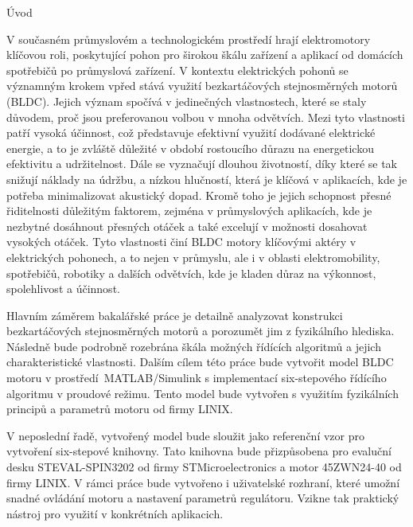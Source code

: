
\def\ctustyle{{\ssr CTUstyle}}
\def\ttb{\tt\char`\\} %

\chap Úvod


V současném průmyslovém a technologickém prostředí hrají elektromotory klíčovou roli, poskytující pohon pro širokou 
škálu zařízení a aplikací od domácích spotřebičů po průmyslová zařízení. V kontextu elektrických pohonů se významným krokem 
vpřed stává využití bezkartáčových stejnosměrných motorů (BLDC). Jejich význam spočívá 
v jedinečných vlastnostech, které se staly důvodem, proč jsou preferovanou volbou v mnoha odvětvích. 
Mezi tyto vlastnosti patří vysoká účinnost, což představuje efektivní využití dodávané elektrické energie, a to je zvláště 
důležité v období rostoucího důrazu na energetickou efektivitu a udržitelnost. Dále se vyznačují dlouhou životností, díky které se
 tak snižují náklady na údržbu, a nízkou hlučností, která je klíčová v aplikacích, kde je potřeba minimalizovat akustický dopad. 
Kromě toho je jejich schopnost přesné řiditelnosti důležitým faktorem, zejména v průmyslových aplikacích, kde je nezbytné 
dosáhnout přesných otáček a také excelují v možnosti dosahovat vysokých otáček. Tyto vlastnosti činí BLDC motory klíčovými aktéry v elektrických pohonech, a to 
nejen v průmyslu, ale i v oblasti elektromobility, spotřebičů, robotiky a dalších odvětvích, kde je kladen důraz na 
výkonnost, spolehlivost a účinnost.

Hlavním záměrem bakalářské práce je detailně analyzovat konstrukci bezkartáčových stejnosměrných motorů a porozumět 
jim z fyzikálního hlediska. Následně bude podrobně rozebrána škála možných řídících algoritmů a jejich charakteristické
vlastnosti. Dalším cílem této práce bude vytvořit model BLDC motoru v prostředí~\nobreak{}MATLAB/Simulink s implementací \nobreak{}six-stepového
řídícího algoritmu v proudové režimu. Tento model bude vytvořen s využitím fyzikálních principů a parametrů motoru od 
firmy LINIX.

V neposlední řadě, vytvořený model bude sloužit jako referenční vzor pro vytvoření six-stepové knihovny. Tato knihovna bude 
přizpůsobena pro evaluční desku STEVAL-\nobreak{}SPIN3202 od firmy STMicroelectronics a motor 45ZWN24-40 od firmy LINIX. V rámci práce bude vytvořeno i uživatelské rozhraní, které 
umožní snadné ovládání motoru a nastavení parametrů regulátoru. Vzikne tak 
praktický nástroj pro využití v konkrétních aplikacich. 

